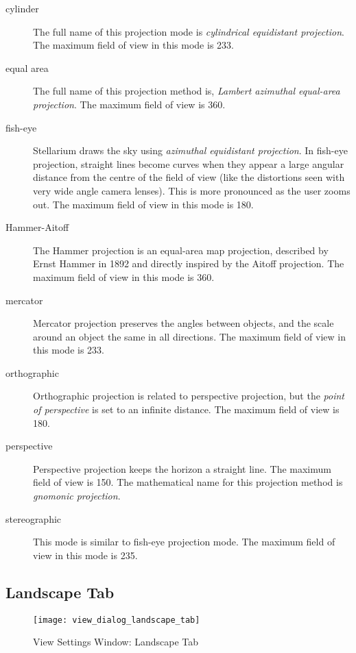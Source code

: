 \begin{description}
  \begin{description}
  \item[cylinder] The full name of this projection mode is
    \emph{cylindrical equidistant projection}. The maximum field of view
    in this mode is 233\degree.
  \item[equal area] The full name of this projection method is,
    \emph{Lambert azimuthal equal-area projection}. The maximum field of
    view is 360\degree.
  \item[fish-eye] Stellarium draws the sky using \emph{azimuthal
    equidistant projection}. In fish-eye projection, straight lines
    become curves when they appear a large angular distance from the
    centre of the field of view (like the distortions seen with very
    wide angle camera lenses). This is more pronounced as the user zooms
    out. The maximum field of view in this mode is 180\degree.
  \item[Hammer-Aitoff] The Hammer projection is an equal-area map
    projection, described by Ernst Hammer in 1892 and directly inspired
    by the Aitoff projection. The maximum field of view in this mode is
    360\degree.
  \item[mercator] Mercator projection preserves the angles between
    objects, and the scale around an object the same in all directions.
    The maximum field of view in this mode is 233\degree.
  \item[orthographic] Orthographic projection is related to
    perspective projection, but the \emph{point of perspective} is set
    to an infinite distance. The maximum field of view is 180\degree.
  \item[perspective] Perspective projection keeps the horizon a
    straight line. The maximum field of view is 150\degree. The mathematical
    name for this projection method is \emph{gnomonic projection}.
  \item[stereographic] This mode is similar to fish-eye projection
    mode. The maximum field of view in this mode is 235\degree.
  \end{description}
\end{description}

\subsection{Landscape Tab}
\label{sec:gui:view:landscape}

\begin{figure}[t]
\centering\texttt{[image: view\_dialog\_landscape\_tab]}
\caption{View Settings Window: Landscape Tab}
\label{fig:gui:view:landscape}
\end{figure}


